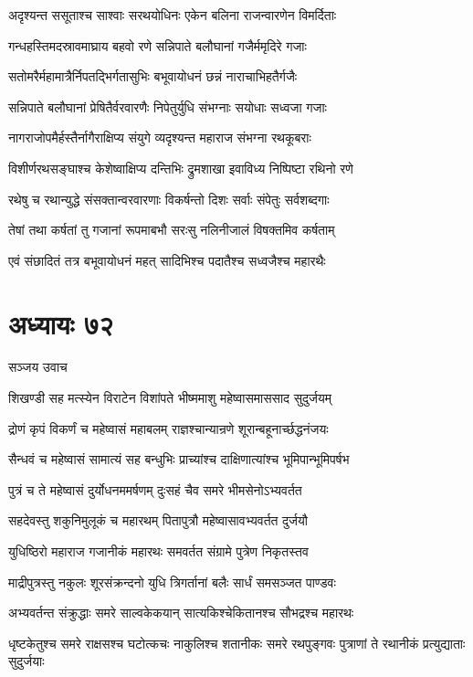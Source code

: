 \twolineshloka
{अदृश्यन्त ससूताश्च साश्वाः सरथयोधिनः}
{एकेन बलिना राजन्वारणेन विमर्दिताः}


\twolineshloka
{गन्धहस्तिमदस्रावमाघ्राय बहवो रणे}
{सन्निपाते बलौघानां गजैर्ममृदिरे गजाः}


\twolineshloka
{सतोमरैर्महामात्रैर्निपतद्भिर्गतासुभिः}
{बभूवायोधनं छन्नं नाराचाभिहतैर्गजैः}


\twolineshloka
{सन्निपाते बलौघानां प्रेषितैर्वरवारणैः}
{निपेतुर्युधि संभग्नाः सयोधाः सध्वजा गजाः}


\twolineshloka
{नागराजोपमैर्हस्तैर्नागैराक्षिप्य संयुगे}
{व्यदृश्यन्त महाराज संभग्ना रथकूबराः}


\twolineshloka
{विशीर्णरथसङ्घाश्च केशेष्वाक्षिप्य दन्तिभिः}
{द्रुमशाखा इवाविध्य निष्पिष्टा रथिनो रणे}


\twolineshloka
{रथेषु च रथान्युद्धे संसक्तान्वरवारणाः}
{विकर्षन्तो दिशः सर्वाः संपेतुः सर्वशब्दगाः}


\twolineshloka
{तेषां तथा कर्षतां तु गजानां रूपमाबभौ}
{सरःसु नलिनीजालं विषक्तमिव कर्षताम्}


\twolineshloka
{एवं संछादितं तत्र बभूवायोधनं महत्}
{सादिभिश्च पदातैश्च सध्वजैश्च महारथैः}


\chapter{अध्यायः ७२}
\twolineshloka
{सञ्जय उवाच}
{}


\twolineshloka
{शिखण्डी सह मत्स्येन विराटेन विशांपते}
{भीष्ममाशु महेष्वासमाससाद सुदुर्जयम्}


\twolineshloka
{द्रोणं कृपं विकर्णं च महेष्वासं महाबलम्}
{राज्ञश्चान्यान्रणे शूरान्बहूनार्च्छद्धनंजयः}


\twolineshloka
{सैन्धवं च महेष्वासं सामात्यं सह बन्धुभिः}
{प्राच्यांश्च दाक्षिणात्यांश्च भूमिपान्भूमिपर्षभ}


\twolineshloka
{पुत्रं च ते महेष्वासं दुर्योधनममर्षणम्}
{दुःसहं चैव समरे भीमसेनोऽभ्यवर्तत}


\twolineshloka
{सहदेवस्तु शकुनिमुलूकं च महारथम्}
{पितापुत्रौ महेष्वासावभ्यवर्तत दुर्जयौ}


\twolineshloka
{युधिष्ठिरो महाराज गजानीकं महारथः}
{समवर्तत संग्रामे पुत्रेण निकृतस्तव}


\twolineshloka
{माद्रीपुत्रस्तु नकुलः शूरसंक्रन्दनो युधि}
{त्रिगर्तानां बलैः सार्धं समसञ्जत पाण्डवः}


\twolineshloka
{अभ्यवर्तन्त संक्रुद्धाः समरे साल्वकेकयान्}
{सात्यकिश्चेकितानश्च सौभद्रश्च महारथः}


\threelineshloka
{धृष्टकेतुश्च समरे राक्षसश्च घटोत्कचः}
{नाकुलिश्च शतानीकः समरे रथपुङ्गवः}
{पुत्राणां ते रथानीकं प्रत्युद्याताः सुदुर्जयाः}


